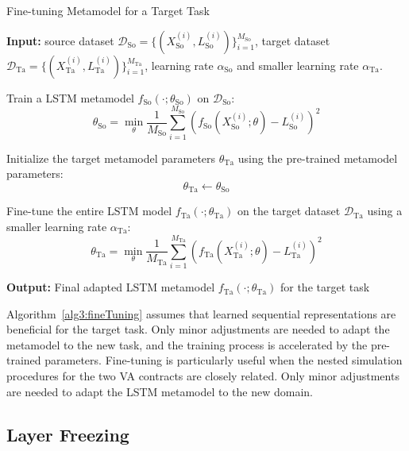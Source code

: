 \begin{algorithm}[ht!]
\caption{Fine-tuning Metamodel for a Target Task}
\begin{algorithmic}[1] \label{alg3:fineTuning}
    \STATE \textbf{Input:} source dataset $\mathcal{D}_{\text{So}} = \{(X_{\text{So}}^{(i)}, L_{\text{So}}^{(i)})\}_{i=1}^{M_{\text{So}}}$, target dataset $\mathcal{D}_{\text{Ta}} = \{(X_{\text{Ta}}^{(i)}, L_{\text{Ta}}^{(i)})\}_{i=1}^{M_{\text{Ta}}}$, learning rate $\alpha_{\text{So}}$ and smaller learning rate $\alpha_{\text{Ta}}$.
    
    \STATE Train a LSTM metamodel $f_{\text{So}}(\cdot; \theta_{\text{So}})$ on $\mathcal{D}_{\text{So}}$:
    \begin{equation}
        \theta_{\text{So}} = \min_{\theta} \frac{1}{M_{\text{So}}} \sum_{i=1}^{M_{\text{So}}} \left( f_{\text{So}}(X_{\text{So}}^{(i)}; \theta) - L_{\text{So}}^{(i)} \right)^2
    \end{equation}

    \STATE Initialize the target metamodel parameters $\theta_{\text{Ta}}$ using the pre-trained metamodel parameters:
    \[
    \theta_{\text{Ta}} \gets \theta_{\text{So}}
    \]
    
    \STATE Fine-tune the entire LSTM model $f_{\text{Ta}}(\cdot; \theta_{\text{Ta}})$ on the target dataset $\mathcal{D}_{\text{Ta}}$ using a smaller learning rate $\alpha_{\text{Ta}}$:
    \begin{equation}
        \theta_{\text{Ta}} = \min_{\theta} \frac{1}{M_{\text{Ta}}} \sum_{i=1}^{M_{\text{Ta}}} \left( f_{\text{Ta}}(X_{\text{Ta}}^{(i)}; \theta) - L_{\text{Ta}}^{(i)} \right)^2
    \end{equation}
    
    \STATE \textbf{Output:} Final adapted LSTM metamodel $f_{\text{Ta}}(\cdot; \theta_{\text{Ta}})$ for the target task
\end{algorithmic}
\end{algorithm}

Algorithm~\ref{alg3:fineTuning} assumes that learned sequential representations are beneficial for the target task.
Only minor adjustments are needed to adapt the metamodel to the new task, and the training process is accelerated by the pre-trained parameters.
Fine-tuning is particularly useful when the nested simulation procedures for the two VA contracts are closely related.
Only minor adjustments are needed to adapt the LSTM metamodel to the new domain.

\subsection{Layer Freezing}

